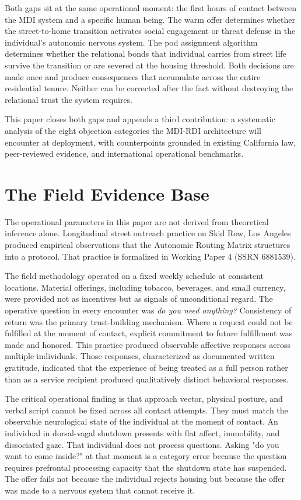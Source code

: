 \documentclass[12pt, letterpaper]{article}
\begin{document}
Both gaps sit at the same operational moment: the first hours of contact between the MDI system and a specific human being. The warm offer determines whether the street-to-home transition activates social engagement or threat defense in the individual's autonomic nervous system. The pod assignment algorithm determines whether the relational bonds that individual carries from street life survive the transition or are severed at the housing threshold. Both decisions are made once and produce consequences that accumulate across the entire residential tenure. Neither can be corrected after the fact without destroying the relational trust the system requires.

This paper closes both gaps and appends a third contribution: a systematic analysis of the eight objection categories the MDI-RDI architecture will encounter at deployment, with counterpoints grounded in existing California law, peer-reviewed evidence, and international operational benchmarks.


\clearpage
\section{The Field Evidence Base}

The operational parameters in this paper are not derived from theoretical inference alone. Longitudinal street outreach practice on Skid Row, Los Angeles produced empirical observations that the Autonomic Routing Matrix structures into a protocol. That practice is formalized in Working Paper 4 (SSRN 6881539).

The field methodology operated on a fixed weekly schedule at consistent locations. Material offerings, including tobacco, beverages, and small currency, were provided not as incentives but as signals of unconditional regard. The operative question in every encounter was \textit{do you need anything?} Consistency of return was the primary trust-building mechanism. Where a request could not be fulfilled at the moment of contact, explicit commitment to future fulfillment was made and honored. This practice produced observable affective responses across multiple individuals. Those responses, characterized as documented written gratitude, indicated that the experience of being treated as a full person rather than as a service recipient produced qualitatively distinct behavioral responses.

The critical operational finding is that approach vector, physical posture, and verbal script cannot be fixed across all contact attempts. They must match the observable neurological state of the individual at the moment of contact. An individual in dorsal-vagal shutdown presents with flat affect, immobility, and dissociated gaze. That individual does not process questions. Asking "do you want to come inside?" at that moment is a category error because the question requires prefrontal processing capacity that the shutdown state has suspended. The offer fails not because the individual rejects housing but because the offer was made to a nervous system that cannot receive it.
\end{document}
